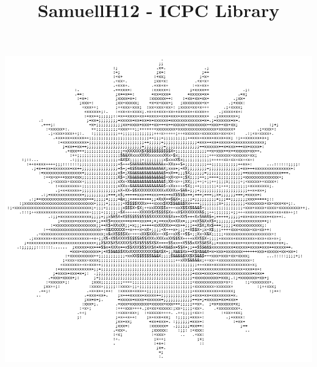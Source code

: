 \documentclass[10pt,a4paper]{article}
\title{\vspace{-4ex}\Large{SamuellH12 - ICPC Library}}
\author{}
\date{}
\begin{document}
\begin{landscape}
\begin{multicols*}{3}
\raggedcolumns 
{}

\maketitle
\vspace{-13ex}
\tableofcontents
\begin{center}\includegraphics[height=0.3\linewidth]{ascii-art.png}\centering\vspace{-3pt}\footnotesize\textit{}\end{center}
\pagestyle{fancy}



\end{multicols*}
\end{landscape}
\end{document}
